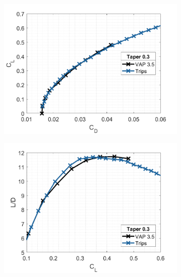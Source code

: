 \begin{figure}[H]
     \centering
     \begin{subfigure}[b]{0.45\textwidth}
         \centering
         \includegraphics[width=\textwidth]{05_Results/Figs/VAP/genMAV/taper3a.png}
         \caption{}
         \label{fig:wing0300}

     \end{subfigure}
     \hfill
     \begin{subfigure}[b]{0.45\textwidth}
         \centering
         \includegraphics[width=\textwidth]{05_Results/Figs/VAP/genMAV/taper3b.png}
         \caption{}
         \label{fig:wing0300b}
      
     \end{subfigure}
     \hfill

        
\end{figure}


